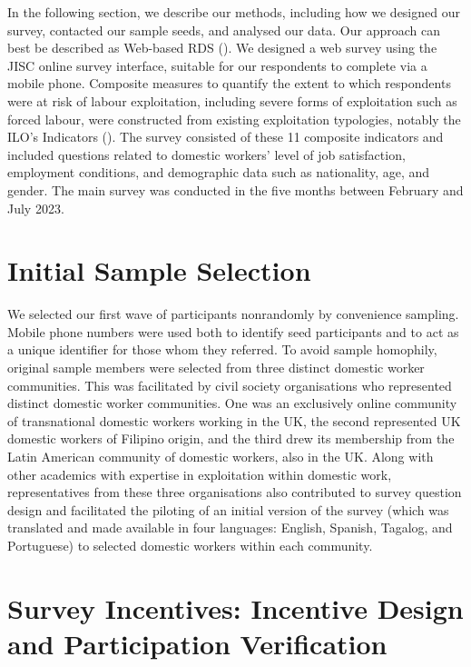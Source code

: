 \documentclass[
  12pt,
  letterpaper,
  DIV=11,
  numbers=noendperiod]{scrartcl}
\theoremstyle{plain}
\theoremstyle{definition}
\begin{document}
In the following section, we describe our methods, including how we
designed our survey, contacted our sample seeds, and analysed our data.
Our approach can best be described as Web-based RDS
(\textcite{wejnert_web-based_2008}). We designed a web survey using the
JISC online survey interface, suitable for our respondents to complete
via a mobile phone. Composite measures to quantify the extent to which
respondents were at risk of labour exploitation, including severe forms
of exploitation such as forced labour, were constructed from existing
exploitation typologies, notably the ILO's Indicators
(\textcite{ILO11-indicators}). The survey consisted of these 11
composite indicators and included questions related to domestic workers'
level of job satisfaction, employment conditions, and demographic data
such as nationality, age, and gender. The main survey was conducted in
the five months between February and July 2023.

\section{Initial Sample Selection}\label{initial-sample-selection}

We selected our first wave of participants nonrandomly by convenience
sampling. Mobile phone numbers were used both to identify seed
participants and to act as a unique identifier for those whom they
referred. To avoid sample homophily, original sample members were
selected from three distinct domestic worker communities. This was
facilitated by civil society organisations who represented distinct
domestic worker communities. One was an exclusively online community of
transnational domestic workers working in the UK, the second represented
UK domestic workers of Filipino origin, and the third drew its
membership from the Latin American community of domestic workers, also
in the UK. Along with other academics with expertise in exploitation
within domestic work, representatives from these three organisations
also contributed to survey question design and facilitated the piloting
of an initial version of the survey (which was translated and made
available in four languages: English, Spanish, Tagalog, and Portuguese)
to selected domestic workers within each community.

\section{Survey Incentives: Incentive Design and Participation
Verification}\label{survey-incentives-incentive-design-and-participation-verification}
\end{document}
